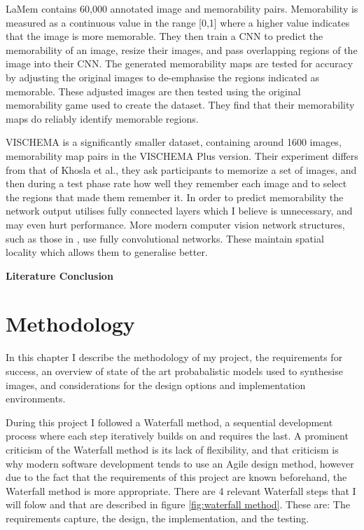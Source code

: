 \documentclass{UoYCSproject}
\begin{document}
LaMem contains 60,000 annotated image and memorability pairs. Memorability is measured as a continuous value in the range [0,1] where a higher value indicates that the image is more memorable. They then train a CNN to predict the memorability of an image, resize their images, and pass overlapping regions of the image into their CNN. The generated memorability maps are tested for accuracy by adjusting the original images to de-emphasise the regions indicated as memorable. These adjusted images are then tested using the original memorability game used to create the dataset. They find that their memorability maps do reliably identify memorable regions.

VISCHEMA is a significantly smaller dataset, containing around 1600 images, memorability map pairs in the VISCHEMA Plus version. Their experiment differs from that of Khosla et al., they ask participants to memorize a set of images, and then during a test phase rate how well they remember each image and to select the regions that made them remember it. In order to predict memorability the network output utilises fully connected layers which I believe is unnecessary, and may even hurt performance. More modern computer vision network structures, such as those in \cite{ronneberger2015unet, goodfellow2014generative, ho2020denoising, isola2018imagetoimage, saharia2022palette}, use fully convolutional networks. These maintain spatial locality which allows them to generalise better.


\textbf{Literature Conclusion}




\chapter{Methodology}


In this chapter I describe the methodology of my project, the requirements for success, an overview of state of the art probabalistic models used to synthesise images, and considerations for the design options and implementation environments. 

During this project I followed a Waterfall method, a sequential development process where each step iteratively builds on and requires the last. A prominent criticism of the Waterfall method is its lack of flexibility, and that criticism is why modern software development tends to use an Agile design method, however due to the fact that the requirements of this project are known beforehand, the Waterfall method is more appropriate. There are 4 relevant Waterfall steps that I will folow and that are described in figure \ref{fig:waterfall method}. These are: The requirements capture, the design, the implementation, and the testing.
\end{document}
